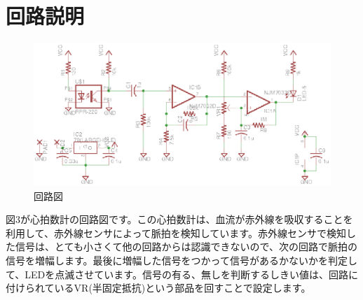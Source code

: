 \documentclass[a4paper]{jarticle}
\begin{document}
\section{回路説明}
\hspace{20mm}
\begin{figure}[H]
 \centering
 \small %
 \includegraphics[width=12cm]{HeartRateMonitor_sch.eps}
 \caption{\small{回路図}} 
\end{figure}
図3が心拍数計の回路図です。この心拍数計は、血流が赤外線を吸収することを利用して、赤外線センサによって脈拍を検知しています。赤外線センサで検知した信号は、とても小さくて他の回路からは認識できないので、次の回路で脈拍の信号を増幅します。最後に増幅した信号をつかって信号があるかないかを判定して、LEDを点滅させています。信号の有る、無しを判断するしきい値は、回路に付けられているVR(半固定抵抗)という部品を回すことで設定します。
\end{document}
